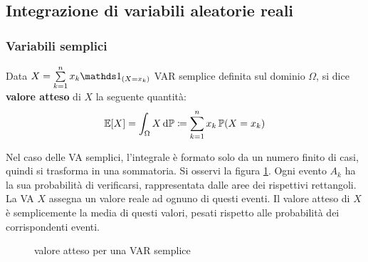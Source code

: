 \subsection{Integrazione di variabili aleatorie reali}
\subsubsection{Variabili semplici}
\begin{defn}\label{defn-valore-atteso-semplici}
  Data $X = \sum\limits_{k=1}^{n} x_k \Ind_{(X = x_k)}$ VAR semplice definita sul dominio $\Omega$, si dice \textbf{valore atteso} di $X$ la seguente quantità:
  $$\mathbb E[X] = \int_{\Omega} X \, \mathrm d \mathbb P \coloneqq \sum\limits_{k=1}^{n} x_k \, \mathbb P(X = x_k)$$
\end{defn}
Nel caso delle VA semplici, l'integrale è formato solo da un numero finito di casi, quindi si trasforma in una sommatoria.
Si osservi la figura \ref{Valore_atteso_VAR_semplice}.
Ogni evento $A_k$ ha la sua probabilità di verificarsi, rappresentata dalle aree dei rispettivi rettangoli.
La VA $X$ assegna un valore reale ad ognuno di questi eventi.
Il valore atteso di $X$ è semplicemente la media di questi valori, pesati rispetto alle probabilità dei corrispondenti eventi.
\begin{figure}[H]
  \centering
  \def\drect {(-1.5, -1.5) rectangle (2.5, 1.5)}
  \caption{valore atteso per una VAR semplice}
  \label{Valore_atteso_VAR_semplice}
\end{figure}
